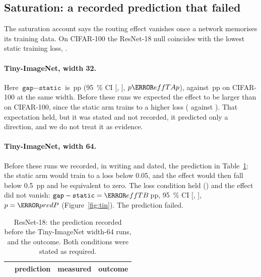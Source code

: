 \documentclass[10pt,a4paper]{article}
\begin{document}
\subsection{Saturation: a recorded prediction that failed}

The saturation account says the routing effect vanishes once a network
memorises its training data. On CIFAR-100 the ResNet-18 null coincides
with the lowest static training loss, .

\paragraph{Tiny-ImageNet, width 32.} Here $\texttt{gap}-\texttt{static}$
is \,pp (\SI{95}{\percent} CI [, ],
$p\V{effTAp}$), against \,pp on CIFAR-100 at the same width.
Before these runs we expected the effect to be larger than on CIFAR-100,
since the static arm trains to a higher loss ( against
). That expectation held, but it was stated and not recorded,
it predicted only a direction, and we do not treat it as evidence.

\paragraph{Tiny-ImageNet, width 64.} Before these runs we recorded, in
writing and dated, the prediction in Table~\ref{tab:predict}: the static
arm would train to a loss below 0.05, and the effect would then fall below
\SI{0.5}{pp} and be equivalent to zero. The loss condition held
() and the effect did not vanish:
$\texttt{gap}-\texttt{static}=\V{effTB}$\,pp, \SI{95}{\percent} CI
[, ], $p=\V{predP}$ (Figure~\ref{fig:tin}). The
prediction failed.

\begin{table}[!htbp]\centering\small
\caption{ResNet-18: the prediction recorded before the Tiny-ImageNet width-64 runs,
and the outcome. Both conditions were stated as required.}
\label{tab:predict}
\begin{tabular}{l p{5.4cm} p{4.6cm} l}
\toprule
& prediction & measured & outcome \\
\midrule
\bottomrule
\end{tabular}
\end{table}
\end{document}
